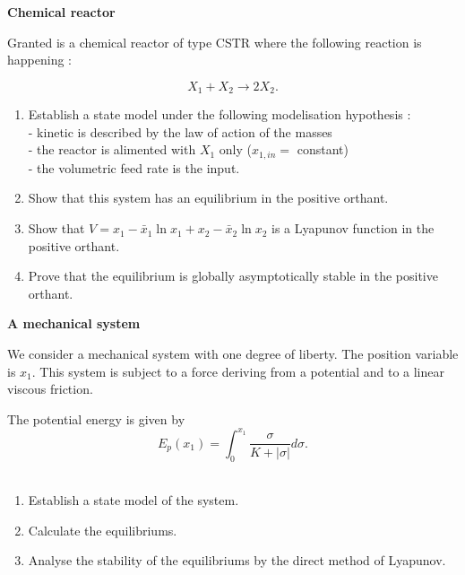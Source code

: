 \begin{exercice}{\bf Chemical reactor}

Granted is a chemical reactor of type CSTR where the following reaction is happening
:

$$
X_1 + X_2 \longrightarrow 2X_2.
$$

\begin{enumerate}
\item Establish a state model under the following modelisation hypothesis
:\\
- kinetic is described by the law of action of the masses\\
- the reactor is alimented with $X_1$ only ($x_{1,in} =$ constant)\\
- the volumetric feed rate is the input.
\item Show that this system has an equilibrium in the positive orthant.
\item Show that $V = x_1-\bar x_1 \ln x_1+x_2-\bar x_2 \ln x_2$ is a Lyapunov function in the positive orthant.
\item Prove that the equilibrium is globally asymptotically stable in the positive orthant.
\end{enumerate}
\end{exercice}
\vv

\begin{exercice}{\bf A mechanical system}

We consider a mechanical system with one degree of liberty. The position variable is $x_1$. This system is subject to a force deriving from a potential and to a linear viscous friction.

The potential energy is given by $$E_p(x_1) = \int^{x_1}_0 \dfrac{\sigma}{K +
|\sigma|} d \sigma.$$\\

\begin{enumerate}
\item Establish a state model of the system.
\item Calculate the equilibriums.
\item Analyse the stability of the equilibriums by the direct method of Lyapunov.
\end{enumerate}
\end{exercice}
\vv

